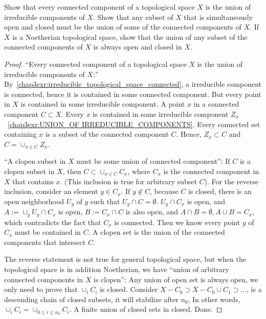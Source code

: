 \documentclass[11pt,fleqn]{book}
\begin{document}
\begin{exr}
Show that every connected component of a topological space $X$ is the union of irreducible components of $X$. Show that any subset of $X$ that is simultaneously open and closed must be the union of some of the connected components of $X$. If $X$ is a Noetherian topological space, show that the union of any subset of the connected components of $X$ is always open and closed in $X$.
\end{exr}
\begin{proof}
``Every connected component of a topological space $X$ is the union of irreducible components of $X$:'' By~\ref{chap3exr:irreducible_topological_space_connected}, a irreducible component is connected, hence it is contained in some connected component. But every point in $X$ is contained in some irreducible component. A point $x$ in a connected component $C\subset X$. Every $x$ is contained in some irreducible component $Z_x$~\ref{chap3exr:UNION_OF IRREDUCIBLE_COMPONENTS}. Every connected set containing $x$ is a subset of the connected component $C$. Hence, $Z_x\subset C$ and $C=\cup_{x\in C} Z_x$.

``A clopen subset in $X$ must be some union of connected component'': If $C$ is a clopen subset in $X$, then $C\subset \cup_{x\in C}C_x$, where $C_x$ is the connected component in $X$ that contains $x$. (This inclusion is true for arbitrary subset $C$). For the reverse inclusion, consider an element $y\in C_x$. If $y\notin C$, because $C$ is closed, there is an open neighborhood $U_y$ of $y$ such that $U_y\cap C=\emptyset$. $U_y\cap C_x$ is open, and $A:=\cup_y U_y\cap C_x$ is open, $B:=C_x\cap C$ is also open, and $A\cap B=\emptyset, A\cup B=C_x$, which contradicts the fact that $C_x$ is connected. Then we know every point $y$ of $C_x$ must be contained in $C$. A clopen set is the union of the connected components that intersect $C$.

The reverse statement is not true for general topological space, but when the topological space is in addition Noetherian, we have ``union of arbitrary connected components in $X$ is clopen'': Any union of open set is always open, we only need to prove that $\cup_i C_i$ is closed. Consider $X-C_0\supset X-C_0\cup C_1\supset...$, is a descending chain of closed subsets, it will stabilize after $n_0$, In other words, $\cup_i C_i=\cup_{0\leq i\leq n_0} C_i$. A finite union of closed sets in closed. Done.

\end{proof}
\end{document}
